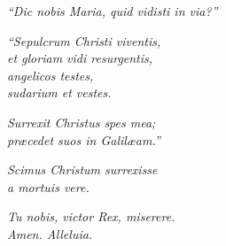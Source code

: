 \spazio

\emph{``Dic nobis Maria, quid vidisti in via?''}

\spazio

\emph{``Sepulcrum Christi viventis,\\ 
et gloriam vidi resurgentis,\\
angelicos testes,\\
sudarium et vestes.}

\spazio

\emph{Surrexit Christus spes mea;\\ 
pr\ae cedet suos in Galil\ae am.''}

\spazio

\emph{Scimus Christum surrexisse\\
a mortuis vere.}

\spazio

\emph{Tu nobis, victor Rex, miserere.\\
Amen. Alleluia.}